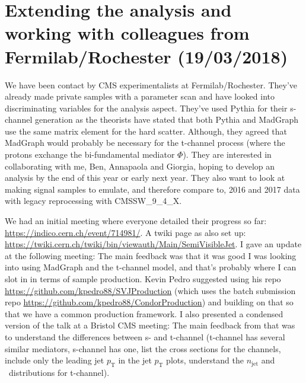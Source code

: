 

\section{Extending the analysis and working with colleagues from Fermilab/Rochester (19/03/2018)}

We have been contact by CMS experimentalists at Fermilab/Rochester. They've already made private samples with a parameter scan and have looked into discriminating variables for the analysis aspect. They've used Pythia for their s-channel generation as the theorists have stated that both Pythia and MadGraph use the same matrix element for the hard scatter. Although, they agreed that MadGraph would probably be necessary for the t-channel process (where the protons exchange the bi-fundamental mediator $\Phi$). They are interested in collaborating with me, Ben, Annapaola and Giorgia, hoping to develop an analysis by the end of this year or early next year. They also want to look at making signal samples to emulate, and therefore compare to, 2016 and 2017 data with legacy reprocessing with CMSSW\_9\_4\_X.

We had an initial meeting where everyone detailed their progress so far: \url{https://indico.cern.ch/event/714981/}. A twiki page as also set up: \url{https://twiki.cern.ch/twiki/bin/viewauth/Main/SemiVisibleJet}. I gave an update at the following meeting: %
The main feedback was that it was good I was looking into using MadGraph and the t-channel model, and that's probably where I can slot in in terms of sample production. Kevin Pedro suggested using his repo \url{https://github.com/kpedro88/SVJProduction} (which uses the batch submission repo \url{https://github.com/kpedro88/CondorProduction}) and building on that so that we have a common production framework. I also presented a condensed version of the talk at a Bristol CMS meeting: %
The main feedback from that was to understand the differences between s- and t-channel (t-channel has several similar mediators, s-channel has one, list the cross sections for the channels, include only the leading jet $p_{\mathrm{T}}$ in the jet $p_{\mathrm{T}}$ plots, understand the $n_{\mathrm{jet}}$ and \etmiss\ distributions for t-channel).

